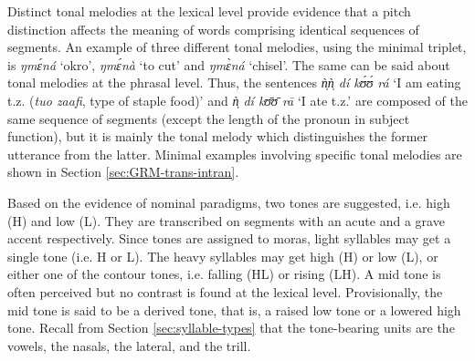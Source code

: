 Distinct tonal melodies at the lexical level provide evidence that a pitch 
distinction affects the meaning of words comprising identical sequences of 
segments.  An example of three different tonal 
melodies, using the minimal triplet, is   {\it ŋmɛ́ná} `okro', {\it ŋmɛ́nà} 
`to cut' and {\it ŋmɛ̀ná}   `chisel'. The same can be said about tonal 
melodies at the phrasal level. Thus, 
the sentences {\it ǹ̩ǹ̩ dí kʊ́ʊ́ rá} `I am eating t.z. ({\it tuo zaafi}, 
type of staple food)' and {\it ǹ̩ dí kʊ̄ʊ̄ rā} `I ate t.z.' are composed of 
the same sequence of segments (except the length of the pronoun in subject 
function), but it is mainly  the tonal melody which distinguishes the former 
utterance from the latter.   Minimal examples involving specific tonal melodies 
are shown  in Section \ref{sec:GRM-trans-intran}.

Based on the evidence of nominal paradigms,  two tones are suggested, i.e. high 
(H) and
low (L).
They are transcribed on segments with an acute and a grave  accent respectively.
Since tones are assigned to moras, light syllables may get a single tone (i.e. H
or L). The heavy syllables may get high (H) or low (L), or either one of the
contour tones, i.e. falling (HL) or rising (LH). A mid tone is often perceived
but no contrast is found  at the lexical level. Provisionally,  the
{mid tone} is said to be a derived tone, that is, a raised low tone  or a 
lowered
high tone. Recall from Section \ref{sec:syllable-types} that the tone-bearing 
units are the vowels, the nasals, the lateral,  and the trill.  


